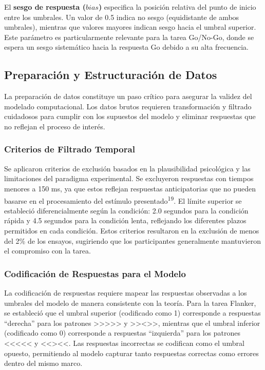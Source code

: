 \documentclass[
  spanish,
  10pt,
]{article}
\begin{document}
El \textbf{sesgo de respuesta (\(bias\))} especifica la posición
relativa del punto de inicio entre los umbrales. Un valor de 0.5 indica
no sesgo (equidistante de ambos umbrales), mientras que valores mayores
indican sesgo hacia el umbral superior. Este parámetro es
particularmente relevante para la tarea Go/No-Go, donde se espera un
sesgo sistemático hacia la respuesta Go debido a su alta frecuencia.

\subsection{Preparación y Estructuración de
Datos}\label{preparaciuxf3n-y-estructuraciuxf3n-de-datos}

La preparación de datos constituye un paso crítico para asegurar la
validez del modelado computacional. Los datos brutos requieren
transformación y filtrado cuidadosos para cumplir con los supuestos del
modelo y eliminar respuestas que no reflejan el proceso de interés.

\subsubsection{Criterios de Filtrado
Temporal}\label{criterios-de-filtrado-temporal}

Se aplicaron criterios de exclusión basados en la plausibilidad
psicológica y las limitaciones del paradigma experimental. Se excluyeron
respuestas con tiempos menores a 150 ms, ya que estos reflejan
respuestas anticipatorias que no pueden basarse en el procesamiento del
estímulo presentado\textsuperscript{19}. El límite superior se
estableció diferencialmente según la condición: 2.0 segundos para la
condición rápida y 4.5 segundos para la condición lenta, reflejando los
diferentes plazos permitidos en cada condición. Estos criterios
resultaron en la exclusión de menos del 2\% de los ensayos, sugiriendo
que los participantes generalmente mantuvieron el compromiso con la
tarea.

\subsubsection{Codificación de Respuestas para el
Modelo}\label{codificaciuxf3n-de-respuestas-para-el-modelo}

La codificación de respuestas requiere mapear las respuestas observadas
a los umbrales del modelo de manera consistente con la teoría. Para la
tarea Flanker, se estableció que el umbral superior (codificado como 1)
corresponde a respuestas ``derecha'' para los patrones
\textgreater\textgreater\textgreater\textgreater\textgreater{} y
\textgreater\textgreater\textless\textgreater\textgreater, mientras que
el umbral inferior (codificado como 0) corresponde a respuestas
``izquierda'' para los patrones
\textless\textless\textless\textless\textless{} y
\textless\textless\textgreater\textless\textless. Las respuestas
incorrectas se codifican como el umbral opuesto, permitiendo al modelo
capturar tanto respuestas correctas como errores dentro del mismo marco.
\end{document}
